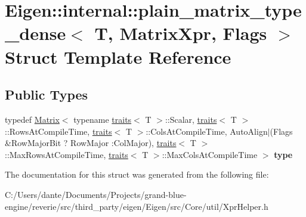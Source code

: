 \hypertarget{struct_eigen_1_1internal_1_1plain__matrix__type__dense_3_01_t_00_01_matrix_xpr_00_01_flags_01_4}{}\section{Eigen\+::internal\+::plain\+\_\+matrix\+\_\+type\+\_\+dense$<$ T, Matrix\+Xpr, Flags $>$ Struct Template Reference}
\label{struct_eigen_1_1internal_1_1plain__matrix__type__dense_3_01_t_00_01_matrix_xpr_00_01_flags_01_4}
\subsection*{Public Types}
\begin{DoxyCompactItemize}
\item 
\mbox{\label{struct_eigen_1_1internal_1_1plain__matrix__type__dense_3_01_t_00_01_matrix_xpr_00_01_flags_01_4_a20824c4fc236283db0c12d79dd3a3117}} 
typedef \mbox{\hyperlink{class_eigen_1_1_matrix}{Matrix}}$<$ typename \mbox{\hyperlink{struct_eigen_1_1internal_1_1traits}{traits}}$<$ T $>$\+::Scalar, \mbox{\hyperlink{struct_eigen_1_1internal_1_1traits}{traits}}$<$ T $>$\+::Rows\+At\+Compile\+Time, \mbox{\hyperlink{struct_eigen_1_1internal_1_1traits}{traits}}$<$ T $>$\+::Cols\+At\+Compile\+Time, Auto\+Align$\vert$(Flags \&Row\+Major\+Bit ? Row\+Major \+:Col\+Major), \mbox{\hyperlink{struct_eigen_1_1internal_1_1traits}{traits}}$<$ T $>$\+::Max\+Rows\+At\+Compile\+Time, \mbox{\hyperlink{struct_eigen_1_1internal_1_1traits}{traits}}$<$ T $>$\+::Max\+Cols\+At\+Compile\+Time $>$ {\bfseries type}
\end{DoxyCompactItemize}


The documentation for this struct was generated from the following file\+:\begin{DoxyCompactItemize}
\item 
C\+:/\+Users/dante/\+Documents/\+Projects/grand-\/blue-\/engine/reverie/src/third\+\_\+party/eigen/\+Eigen/src/\+Core/util/Xpr\+Helper.\+h\end{DoxyCompactItemize}
